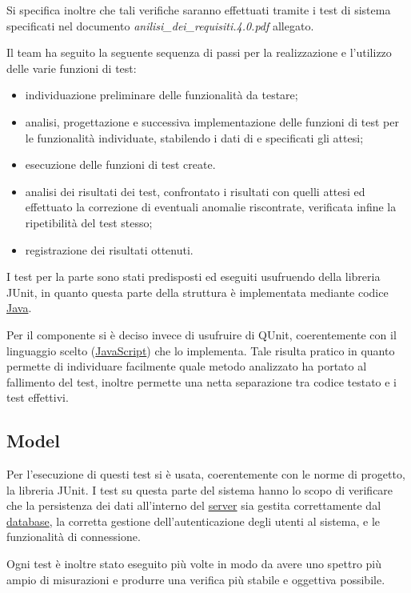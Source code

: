 Si specifica inoltre che tali verifiche saranno effettuati tramite i test di sistema specificati nel documento \textit{anilisi\_dei\_requisiti.4.0.pdf} allegato.

Il team ha seguito la seguente sequenza di passi per la realizzazione e l'utilizzo delle varie funzioni di test:
\begin{itemize}[noitemsep,nolistsep]
\item individuazione preliminare delle funzionalità da testare;
\item analisi, progettazione e successiva implementazione delle funzioni di test per le funzionalità individuate, stabilendo i dati di  e specificati gli  attesi;
\item esecuzione delle funzioni di test create.
\item analisi dei risultati dei test, confrontato i risultati con quelli attesi ed effettuato la correzione di eventuali anomalie riscontrate, verificata infine la ripetibilità del test stesso;
\item registrazione dei risultati ottenuti.
\end{itemize}

I test per la parte  sono stati predisposti ed eseguiti usufruendo della libreria JUnit, in quanto questa parte della struttura è implementata mediante codice \underline{Java}.

Per il componente  si è deciso invece di usufruire di QUnit, coerentemente con il linguaggio scelto (\underline{JavaScript}) che lo implementa. Tale \underline{} risulta pratico in quanto permette di individuare facilmente quale metodo analizzato ha portato al fallimento del test, inoltre permette una netta separazione tra codice testato e i test effettivi.

\subsection{Model}
Per l'esecuzione di questi test si è usata, coerentemente con le norme di progetto, la libreria JUnit. I test su questa parte del sistema hanno lo scopo di verificare che la persistenza dei dati all'interno del \underline{server} sia gestita correttamente dal \underline{database}, la corretta gestione dell'autenticazione degli utenti al sistema, e le funzionalità di connessione.

Ogni test è inoltre stato eseguito più volte in modo da avere uno spettro più ampio di misurazioni e produrre una verifica più stabile e oggettiva possibile.



